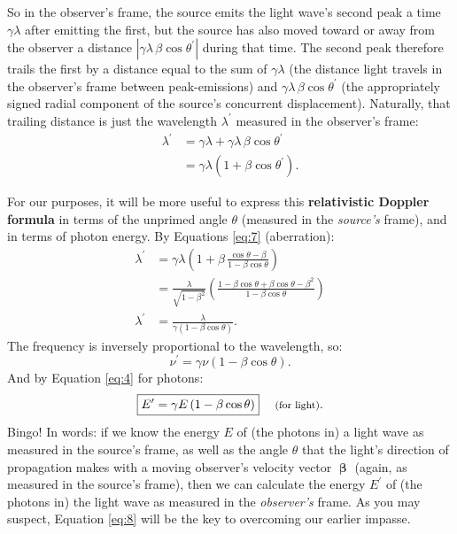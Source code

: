 \documentclass[12pt]{article}
\newcommand{\vvbeta}{\bm{\upbeta}}
\begin{document}
So in the observer's frame, the source emits the light wave's second peak a time $\gamma \lambda$ after emitting the first, but the source has also moved toward or away from the observer a distance $| \gamma \lambda \, \beta \cos \theta^\prime |$ during that time. The second peak therefore trails the first by a distance equal to the sum of $\gamma \lambda$ (the distance light travels in the observer's frame between peak-emissions) and $\gamma \lambda \, \beta \cos \theta^\prime$ (the appropriately signed radial component of the source's concurrent displacement). Naturally, that trailing distance is just the wavelength $\lambda^\prime$ measured in the observer's frame:
\begin{equation*}
\begin{aligned}
\lambda^\prime &= \gamma \lambda + \gamma \lambda \, \beta \cos \theta^\prime \\
&= \gamma \lambda \left( 1 + \beta \cos \theta^\prime \right).
\end{aligned}
\end{equation*}

For our purposes, it will be more useful to express this \textbf{relativistic Doppler formula} in terms of the unprimed angle $\theta$ (measured in the \emph{source's} frame), and in terms of photon energy. By Equations \ref{eq:7} (aberration):
\begin{equation*}
\begin{aligned}
\lambda^\prime &= \gamma \lambda \left( 1 + \beta \, \frac{\cos \theta - \beta}{1 - \beta \cos \theta} \right) \\[3pt]
&= \frac{\lambda}{\sqrt{1 - \beta^2}} \left( \frac{ 1 - \beta \cos \theta + \beta \cos \theta - \beta^2 }{1 - \beta \cos \theta} \right) \\[3pt]
\lambda^\prime &= \frac{\lambda}{\gamma \left( 1 - \beta \cos \theta \right)}.
\end{aligned}
\end{equation*}
The frequency is inversely proportional to the wavelength, so:
\begin{equation*}
\nu^{\prime} = \gamma \nu \left( 1- \beta \cos\theta \right).
\end{equation*}
And by Equation \ref{eq:4} for photons:
\begin{equation}\label{eq:8}
\boxed{E^{\prime} = \gamma E \left(1-\beta \cos\theta\right)} \quad \text{\footnotesize{ (for light)}} .
\end{equation}
Bingo! In words: if we know the energy $E$ of (the photons in) a light wave as measured in the source's frame, as well as the angle $\theta$ that the light's direction of propagation makes with a moving observer's velocity vector $\vvbeta$ (again, as measured in the source's frame), then we can calculate the energy $E^\prime$ of (the photons in) the light wave as measured in the \emph{observer's} frame. As you may suspect, Equation \ref{eq:8} will be the key to overcoming our earlier impasse.
\end{document}
